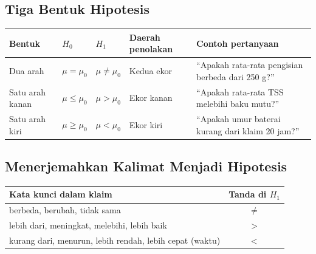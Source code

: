 \documentclass[
  indonesian,
  letterpaper,
]{book}
\newcounter{none} %
\begin{document}
\subsection{Tiga Bentuk Hipotesis}\label{tiga-bentuk-hipotesis}

{\def\LTcaptype{none} %
\begin{longtable}[]{@{}
  >{\raggedright\arraybackslash}p{}
  >{\centering\arraybackslash}p{}
  >{\centering\arraybackslash}p{}
  >{\raggedright\arraybackslash}p{}
  >{\raggedright\arraybackslash}p{}@{}}
\toprule\noalign{}
\begin{minipage}[b]{\linewidth}\raggedright
Bentuk
\end{minipage} & \begin{minipage}[b]{\linewidth}\centering
\(H_0\)
\end{minipage} & \begin{minipage}[b]{\linewidth}\centering
\(H_1\)
\end{minipage} & \begin{minipage}[b]{\linewidth}\raggedright
Daerah penolakan
\end{minipage} & \begin{minipage}[b]{\linewidth}\raggedright
Contoh pertanyaan
\end{minipage} \\
\midrule\noalign{}
\endhead
\bottomrule\noalign{}
\endlastfoot
Dua arah & \(\mu = \mu_0\) & \(\mu \neq \mu_0\) & Kedua ekor & ``Apakah
rata-rata pengisian berbeda dari 250 g?'' \\
Satu arah kanan & \(\mu \leq \mu_0\) & \(\mu > \mu_0\) & Ekor kanan &
``Apakah rata-rata TSS melebihi baku mutu?'' \\
Satu arah kiri & \(\mu \geq \mu_0\) & \(\mu < \mu_0\) & Ekor kiri &
``Apakah umur baterai kurang dari klaim 20 jam?'' \\
\end{longtable}
}

\subsection{Menerjemahkan Kalimat Menjadi
Hipotesis}\label{menerjemahkan-kalimat-menjadi-hipotesis}

{\def\LTcaptype{none} %
\begin{longtable}[]{@{}lc@{}}
\toprule\noalign{}
Kata kunci dalam klaim & Tanda di \(H_1\) \\
\midrule\noalign{}
\endhead
\bottomrule\noalign{}
\endlastfoot
berbeda, berubah, tidak sama & \(\neq\) \\
lebih dari, meningkat, melebihi, lebih baik & \(>\) \\
kurang dari, menurun, lebih rendah, lebih cepat (waktu) & \(<\) \\
\end{longtable}
}
\end{document}
